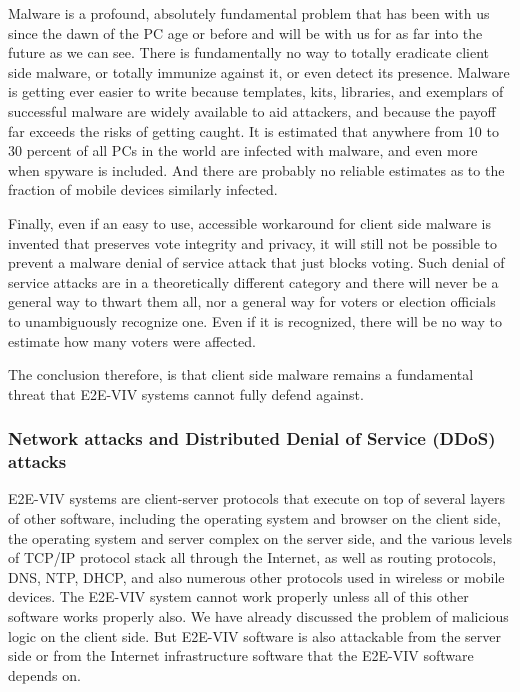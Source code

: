 Malware is a profound, absolutely fundamental problem that has been
with us since the dawn of the PC age or before and will be with us for
as far into the future as we can see. There is fundamentally no way to
totally eradicate client side malware, or totally immunize against it,
or even detect its presence. Malware is getting ever easier to write
because templates, kits, libraries, and exemplars of successful
malware are widely available to aid attackers, and because the payoff
far exceeds the risks of getting caught. It is estimated that anywhere
from 10 to 30 percent of all PCs in the world are infected with
malware, and even more when spyware is included. And there are
probably no reliable estimates as to the fraction of mobile devices
similarly infected.

Finally, even if an easy to use, accessible workaround for client side
malware is invented that preserves vote integrity and privacy, it will
still not be possible to prevent a malware denial of service attack
that just blocks voting. Such denial of service attacks are in a
theoretically different category and there will never be a general way
to thwart them all, nor a general way for voters or election officials
to unambiguously recognize one. Even if it is recognized, there will
be no way to estimate how many voters were affected.

The conclusion therefore, is that client side malware remains a
fundamental threat that E2E-VIV systems cannot fully defend against. 

\subsubsection{Network attacks and Distributed Denial of Service
  (DDoS) attacks}

E2E-VIV systems are client-server protocols that execute on top of
several layers of other software, including the operating system and
browser on the client side, the operating system and server complex on
the server side, and the various levels of TCP/IP protocol stack all
through the Internet, as well as routing protocols, DNS, NTP, DHCP,
and also numerous other protocols used in wireless or mobile
devices. The E2E-VIV system cannot work properly unless all of this
other software works properly also. We have already discussed the
problem of malicious logic on the client side. But E2E-VIV software is
also attackable from the server side or from the Internet
infrastructure software that the E2E-VIV software depends on.

